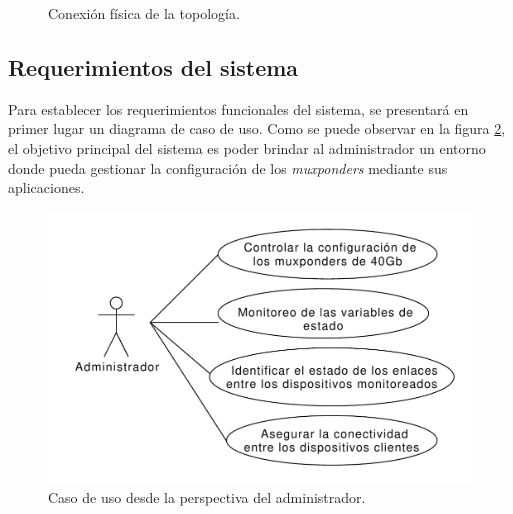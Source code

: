\begin{figure}[H]
    \centering
    \caption{Conexión física de la topología.}
    \label{fig:topologiafis}
  \end{figure}


\subsection{Requerimientos del sistema}

Para establecer los requerimientos funcionales del sistema, se presentará en primer lugar un diagrama de caso de uso. Como se puede observar en la figura \ref{fig:caso_uso_admin}, el objetivo principal del sistema es poder brindar al administrador un entorno donde pueda gestionar la configuración de los \textit{muxponders} mediante sus aplicaciones.

\begin{figure}[H]
    \centering
    \includegraphics[scale=0.53]{Figures/caso_uso_admin.pdf}
    \caption{Caso de uso desde la perspectiva del administrador.}
    \label{fig:caso_uso_admin}
  \end{figure}

